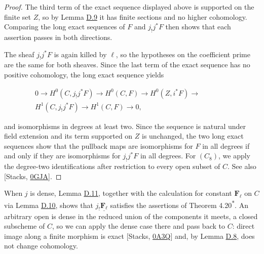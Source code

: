 \documentclass[11pt]{article}
\newcommand{\bpout}[1]{#1\textsuperscript{\hyperlink{bp-outside}{\ensuremath{\ast}}}}
\begin{document}
\begin{proof}[{Proof}]\label{bp40}%
The third term of the exact sequence displayed above is supported on the finite set \(Z\), so by Lemma \hyperref[bp31]{D.9} it has finite sections and no higher cohomology. Comparing the long exact sequences of \(F\) and \(j_!j^*F\) then shows that each assertion passes in both directions.

The sheaf \(j_!j^*F\) is again killed by \(\ell\), so the hypotheses on the coefficient prime are the same for both sheaves. Since the last term of the exact sequence has no positive cohomology, the long exact sequence yields

\[
\begin{split}
0\to H^0(C,j_!j^*F)\to H^0(C,F)\to H^0(Z,i^*F)\to{}\qquad\qquad\\
H^1(C,j_!j^*F)\to H^1(C,F)\to0,
\end{split}
\]

and isomorphisms in degrees at least two. Since the sequence is natural under field extension and its term supported on \(Z\) is unchanged, the two long exact sequences show that the pullback maps are isomorphisms for \(F\) in all degrees if and only if they are isomorphisms for \(j_!j^*F\) in all degrees. For \((C_8)\), we apply the degree-two identifications after restriction to every open subset of \(C\). See also [Stacks, \href{https://stacks.math.columbia.edu/tag/0GJA}{0GJA}].
\end{proof}

\label{bp41}%
When \(j\) is dense, Lemma \hyperref[bp39]{D.11}, together with the calculation for constant \(\mathbf F_\ell\) on \(C\) via Lemma \hyperref[bp34]{D.10}, shows that \(j_!\underline{\mathbf F_\ell}\) satisfies the assertions of Theorem \bpout{4.20}. An arbitrary open is dense in the reduced union of the components it meets, a closed subscheme of \(C\), so we can apply the dense case there and pass back to \(C\): direct image along a finite morphism is exact [Stacks, \href{https://stacks.math.columbia.edu/tag/0A3Q}{0A3Q}] and, by Lemma \hyperref[bp28]{D.8}, does not change cohomology.


\end{document}
